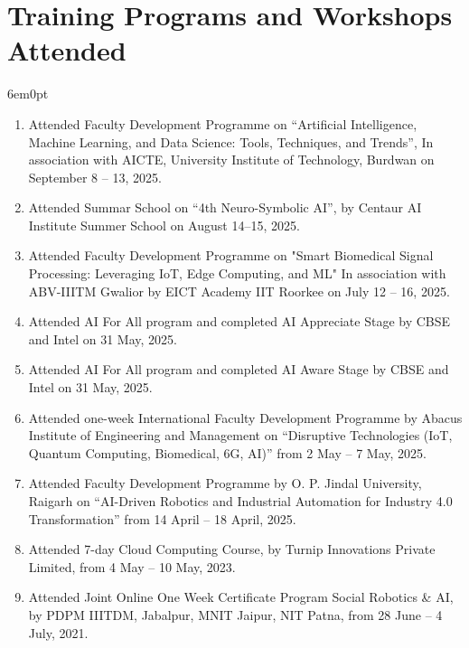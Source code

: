 \documentclass[11pt,a4paper]{moderncv}
\begin{document}
\section{\textbf{Training Programs and Workshops Attended}}

\begin{adjustwidth}{6em}{0pt}
	\begin{enumerate}
		
		\item Attended Faculty Development Programme on “Artificial Intelligence, Machine Learning, and Data Science: Tools, Techniques, and Trends”, In association with AICTE, University Institute of Technology, Burdwan on September 8 – 13, 2025.
		
		\item Attended Summar School on “4th Neuro-Symbolic AI”, by  Centaur AI Institute Summer School on August 14–15, 2025.
		
		\item Attended Faculty Development Programme on "Smart Biomedical Signal Processing: Leveraging IoT, Edge Computing, and ML" In association with ABV-IIITM Gwalior by EICT Academy IIT Roorkee on July 12 – 16, 2025.
				
		\item Attended AI For All program and completed AI Appreciate Stage by CBSE and Intel on 31 May, 2025.
		
		\item Attended AI For All program and completed AI Aware Stage by CBSE and Intel on 31 May, 2025.
		
		\item Attended one-week International Faculty Development Programme by Abacus Institute of Engineering and Management on “Disruptive Technologies (IoT, Quantum Computing, Biomedical, 6G, AI)” from 2 May – 7 May, 2025.
		
		\item Attended Faculty Development Programme by O. P. Jindal University, Raigarh on “AI-Driven Robotics and Industrial Automation for Industry 4.0 Transformation” from 14 April – 18 April, 2025.
		
		\item Attended 7-day Cloud Computing Course, by Turnip Innovations Private Limited, from 4 May – 10 May, 2023.
		
		\item Attended Joint Online One Week Certificate Program Social Robotics \& AI, by PDPM IIITDM, Jabalpur, MNIT Jaipur, NIT Patna, from 28 June – 4 July, 2021.
		

\end{enumerate}
\end{adjustwidth}
\end{document}
